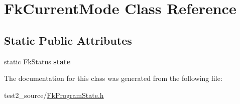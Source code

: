 \hypertarget{class_fk_current_mode}{}\section{Fk\+Current\+Mode Class Reference}
\label{class_fk_current_mode}
\subsection*{Static Public Attributes}
\begin{DoxyCompactItemize}
\item 
\hypertarget{class_fk_current_mode_aacb02d05069c2ecf0f4d6f98ac6524c2}{}static Fk\+Status {\bfseries state}\label{class_fk_current_mode_aacb02d05069c2ecf0f4d6f98ac6524c2}

\end{DoxyCompactItemize}


The documentation for this class was generated from the following file\+:\begin{DoxyCompactItemize}
\item 
test2\+\_\+source/\hyperlink{_fk_program_state_8h}{Fk\+Program\+State.\+h}\end{DoxyCompactItemize}
